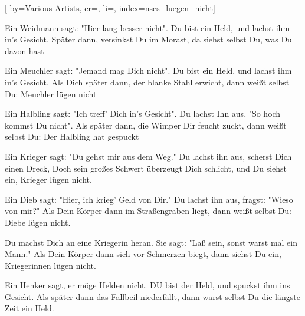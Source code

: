 

[%
    by={Various Artists},
    cr={},
    li={},
    index={nscs_luegen_nicht}]


    \label{nscs_luegen_nicht}

    \beginverse\memorize[verse]
        Ein Weidmann sagt: "Hier lang besser nicht".
        Du bist ein Held, und lachst ihm in's Gesicht.
        Später dann, versinkst Du im Morast,
        da siehst selbst Du, was Du davon hast
    \endverse

    \beginverse\replay[verse]
        Ein Meuchler sagt: "Jemand mag Dich nicht".
        Du bist ein Held, und lachst ihm in's Gesicht.
        Als Dich später dann, der blanke Stahl erwicht,
        dann weißt selbst Du: Meuchler lügen nicht
    \endverse

    \beginverse\replay[verse]
        Ein Halbling sagt: "Ich treff' Dich in's Gesicht".
        Du lachst Ihn aus, "So hoch kommst Du nicht".
        Als später dann, die Wimper Dir feucht zuckt,
        dann weißt selbst Du: Der Halbling hat gespuckt
    \endverse

    \beginverse\replay[verse]
        Ein Krieger sagt: "Du gehst mir aus dem Weg."
        Du lachst ihn aus, scherst Dich einen Dreck,
        Doch sein großes Schwert überzeugt Dich schlicht,
        und Du siehst ein, Krieger lügen nicht.
    \endverse

    \beginverse\replay[verse]
        Ein Dieb sagt: "Hier, ich krieg' Geld von Dir."
        Du lachst ihn aus, fragst: "Wieso von mir?"
        Als Dein Körper dann im Straßengraben liegt,
        dann weißt selbst Du: Diebe lügen nicht.
    \endverse

    \beginverse\replay[verse]
        Du machst Dich an eine Kriegerin heran.
        Sie sagt: "Laß sein, sonst warst mal ein Mann."
        Als Dein Körper dann sich vor Schmerzen biegt,
        dann siehst Du ein, Kriegerinnen lügen nicht.
    \endverse

    \beginverse\replay[verse]
        Ein Henker sagt, er möge Helden nicht.
        DU bist der Held, und spuckst ihm ins Gesicht.
        Als später dann das Fallbeil niederfällt,
        dann warst selbst Du die längste Zeit ein Held.
    \endverse
\endsong
